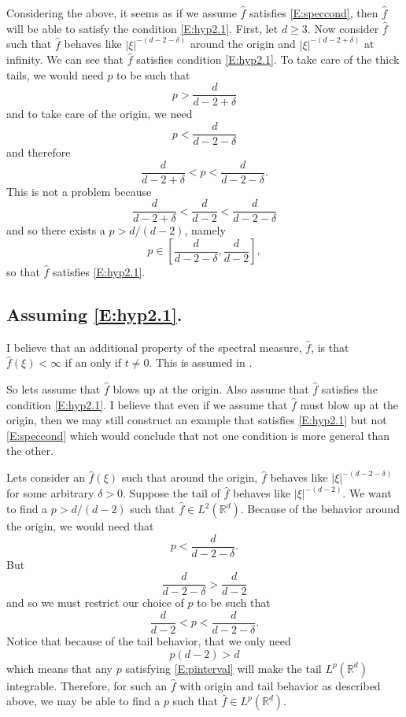 \documentclass{article}
\numberwithin{equation}{section}
\newcommand{\R}{\mathbb{R}}
\begin{document}
Considering the above, it seems as if we assume $\hat{f}$ satisfies \eqref{E:speccond}, then $\hat{f}$ will be able to satisfy the condition \eqref{E:hyp2.1}. First, let $d \ge 3$. Now consider $\hat{f}$ such that $\hat{f}$ behaves like $|\xi|^{-(d-2-\delta)}$ around the origin and $|\xi|^{-(d-2+\delta)}$ at infinity. We can see that $\hat{f}$ satisfies condition \eqref{E:hyp2.1}. To take care of the thick tails, we would need $p$ to be such that
	\begin{equation}
		p > \frac{d}{d-2+\delta}
	\end{equation}
and to take care of the origin, we need
	\begin{equation}
		p < \frac{d}{d - 2 -\delta}
	\end{equation}
and therefore
	\begin{equation}
		\frac{d}{d-2+\delta} < p < \frac{d}{d - 2 -\delta}.
	\end{equation}
This is not a problem because
	\[
			\frac{d}{d-2+\delta} < \frac{d}{d-2}  < \frac{d}{d - 2 -\delta}
	\]
and so there exists a $p > d/(d-2)$, namely
	\[
		 p \in \left[\frac{d}{d - 2 -\delta}, \frac{d}{d-2}  \right],
	\]
so that $\hat{f}$ satisfies \eqref{E:hyp2.1}.

\subsection{Assuming \eqref{E:hyp2.1}.}

I believe that an additional property of the spectral measure, $\hat{f}$, is that $\hat{f}(\xi) < \infty$ if an only if $t \not= 0$. This is assumed in \cite{BC16}.

So lets assume that $\hat{f}$ blows up at the origin. Also assume that $\hat{f}$ satisfies the condition \eqref{E:hyp2.1}. I believe that even if we assume that $\hat{f}$ must blow up at the origin, then we may still construct an example that satisfies \eqref{E:hyp2.1} but not \eqref{E:speccond} which would conclude that not one condition is more general than the other.

Lets consider an $\hat{f}(\xi)$ such that around the origin, $\hat{f}$ behaves like $|\xi|^{-(d-2-\delta)}$ for some arbitrary $\delta >0$. Suppose the tail of $\hat{f}$ behaves like $|\xi|^{-(d-2)}$. We want to find a $p > d/(d-2)$ such that $\hat{f} \in L^2(\R^d)$.  Because of the behavior around the origin, we would need that
	\[
		p < \frac{d}{d-2-\delta}.
	\]
But
	\[
		\frac{d}{d-2-\delta} > \frac{d}{d-2}
	\]
and so we must restrict our choice of $p$ to be such that
	\begin{equation}\label{E:pinterval}
		\frac{d}{d-2} < p < \frac{d}{d-2-\delta} .
	\end{equation}
Notice that because of the tail behavior, that we only need
	\[
		p(d-2) > d
	\]
which means that any $p$ satisfying \eqref{E:pinterval} will make the tail $L^p(\R^d)$ integrable. Therefore, for such an $\hat{f}$ with origin and tail behavior as described above, we may be able to find a $p$ such that $\hat{f} \in L^p(\R^d)$.
\end{document}
